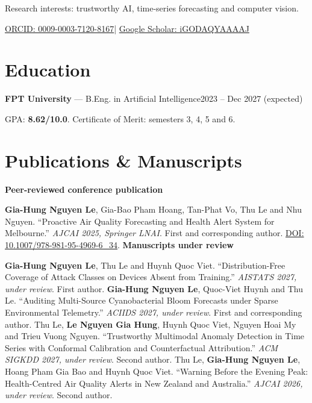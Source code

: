 \documentclass[11pt,a4paper]{article}
\begin{document}
{Research interests: trustworthy AI, time-series forecasting and computer vision.}
{\fontsize{10}{12}\selectfont
\href{https://orcid.org/0009-0003-7120-8167}{ORCID: 0009-0003-7120-8167}\enspace|\enspace
\href{https://scholar.google.com/citations?user=iGODAQYAAAAJ}{Google Scholar: iGODAQYAAAAJ}\par}

\section{Education}
\textbf{FPT University} --- B.Eng. in Artificial Intelligence\hfill{\small 2023 -- Dec 2027 (expected)}\par
GPA: \textbf{8.62/10.0}. Certificate of Merit: semesters 3, 4, 5 and 6.

\section{Publications \& Manuscripts}
\textbf{Peer-reviewed conference publication}\par
\textbf{Gia-Hung Nguyen Le}, Gia-Bao Pham Hoang, Tan-Phat Vo, Thu Le and Nhu Nguyen.
``Proactive Air Quality Forecasting and Health Alert System for Melbourne.''
\textit{AJCAI 2025, Springer LNAI}. First and corresponding author.
\href{https://doi.org/10.1007/978-981-95-4969-6_34}{DOI: 10.1007/978-981-95-4969-6\_34}.
\paperGap
\textbf{Manuscripts under review}\par
\textbf{Gia-Hung Nguyen Le}, Thu Le and Huynh Quoc Viet.
``Distribution-Free Coverage of Attack Classes on Devices Absent from Training.''
\textit{AISTATS 2027, under review}. First author.
\paperGap
\textbf{Gia-Hung Nguyen Le}, Quoc-Viet Huynh and Thu Le.
``Auditing Multi-Source Cyanobacterial Bloom Forecasts under Sparse Environmental Telemetry.''
\textit{ACIIDS 2027, under review}. First and corresponding author.
\paperGap
Thu Le, \textbf{Le Nguyen Gia Hung}, Huynh Quoc Viet, Nguyen Hoai My and Trieu Vuong Nguyen.
``Trustworthy Multimodal Anomaly Detection in Time Series with Conformal Calibration and Counterfactual Attribution.''
\textit{ACM SIGKDD 2027, under review}. Second author.
\paperGap
Thu Le, \textbf{Gia-Hung Nguyen Le}, Hoang Pham Gia Bao and Huynh Quoc Viet.
``Warning Before the Evening Peak: Health-Centred Air Quality Alerts in New Zealand and Australia.''
\textit{AJCAI 2026, under review}. Second author.
\end{document}
